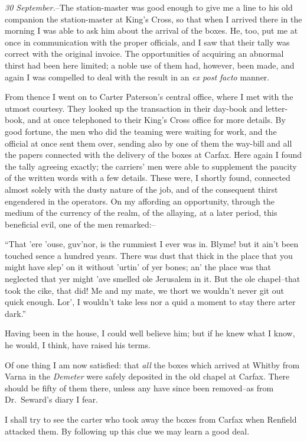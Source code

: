 \documentclass[12pt,openright]{book}
\begin{document}
\textit{30 September.}–The station-master was good enough to give me a line to his old companion the station-master at King’s Cross, so that when I arrived there in the morning I was able to ask him about the arrival of the boxes. He, too, put me at once in communication with the proper officials, and I saw that their tally was correct with the original invoice. The opportunities of acquiring an abnormal thirst had been here limited; a noble use of them had, however, been made, and again I was compelled to deal with the result in an \textit{ex post facto} manner.

From thence I went on to Carter Paterson’s central office, where I met with the utmost courtesy. They looked up the transaction in their day-book and letter-book, and at once telephoned to their King’s Cross office for more details. By good fortune, the men who did the teaming were waiting for work, and the official at once sent them over, sending also by one of them the way-bill and all the papers connected with the delivery of the boxes at Carfax. Here again I found the tally agreeing exactly; the carriers’ men were able to supplement the paucity of the written words with a few details. These were, I shortly found, connected almost solely with the dusty nature of the job, and of the consequent thirst engendered in the operators. On my affording an opportunity, through the medium of the currency of the realm, of the allaying, at a later period, this beneficial evil, one of the men remarked:–

“That ’ere ’ouse, guv’nor, is the rummiest I ever was in. Blyme! but it ain’t been touched sence a hundred years. There was dust that thick in the place that you might have slep’ on it without ’urtin’ of yer bones; an’ the place was that neglected that yer might ’ave smelled ole Jerusalem in it. But the ole chapel–that took the cike, that did! Me and my mate, we thort we wouldn’t never git out quick enough. Lor’, I wouldn’t take less nor a quid a moment to stay there arter dark.”

Having been in the house, I could well believe him; but if he knew what I know, he would, I think, have raised his terms.

Of one thing I am now satisfied: that \textit{all} the boxes which arrived at Whitby from Varna in the \textit{Demeter} were safely deposited in the old chapel at Carfax. There should be fifty of them there, unless any have since been removed–as from Dr. Seward’s diary I fear.

I shall try to see the carter who took away the boxes from Carfax when Renfield attacked them. By following up this clue we may learn a good deal.
\end{document}
